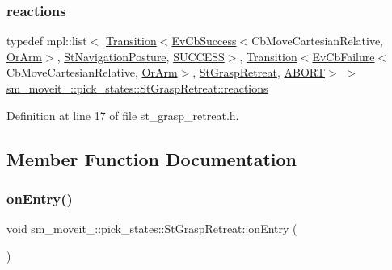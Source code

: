 \subsubsection{\texorpdfstring{reactions}{reactions}}
{\footnotesize\ttfamily typedef mpl\+::list$<$ \hyperlink{classsmacc_1_1Transition}{Transition}$<$\hyperlink{structsmacc_1_1EvCbSuccess}{Ev\+Cb\+Success}$<$Cb\+Move\+Cartesian\+Relative, \hyperlink{classsm__moveit__4_1_1OrArm}{Or\+Arm}$>$, \hyperlink{structsm__moveit__4_1_1pick__states_1_1StNavigationPosture}{St\+Navigation\+Posture}, \hyperlink{structsmacc_1_1default__transition__tags_1_1SUCCESS}{S\+U\+C\+C\+E\+SS}$>$, \hyperlink{classsmacc_1_1Transition}{Transition}$<$\hyperlink{structsmacc_1_1EvCbFailure}{Ev\+Cb\+Failure}$<$Cb\+Move\+Cartesian\+Relative, \hyperlink{classsm__moveit__4_1_1OrArm}{Or\+Arm}$>$, \hyperlink{structsm__moveit__4_1_1pick__states_1_1StGraspRetreat}{St\+Grasp\+Retreat}, \hyperlink{structsmacc_1_1default__transition__tags_1_1ABORT}{A\+B\+O\+RT}$>$ $>$ \hyperlink{structsm__moveit__4_1_1pick__states_1_1StGraspRetreat_a8636f6a099bdb79aaac485b188fd833b}{sm\+\_\+moveit\+\_\+::pick\+\_\+states\+::\+St\+Grasp\+Retreat\+::reactions}}



Definition at line 17 of file st\+\_\+grasp\+\_\+retreat.\+h.



\subsection{Member Function Documentation}
\mbox{\label{structsm__moveit__4_1_1pick__states_1_1StGraspRetreat_a72c11fb9d9c2a1180314e03b436334d7}} 
\subsubsection{\texorpdfstring{on\+Entry()}{onEntry()}}
{\footnotesize\ttfamily void sm\+\_\+moveit\+\_\+::pick\+\_\+states\+::\+St\+Grasp\+Retreat\+::on\+Entry (\begin{DoxyParamCaption}{ }\end{DoxyParamCaption})\hspace{0.3cm}{\ttfamily [inline]}}



